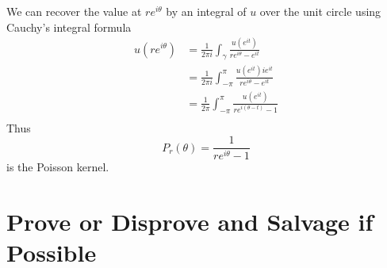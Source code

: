 \documentclass{homework}
\begin{document}
                                                                                                                                             \begin{solution}
                                                                                                                                             We can recover the value at $re^{i\theta}$ by an integral of $u$ over the unit circle using Cauchy's integral formula
                                                                                                                                             \begin{align*}
                                                                                                                                             u(re^{i\theta}) &= \frac{1}{2\pi i}\int_{\gamma} \frac{u(e^{it})}{re^{i\theta} - e^{it}}\\
                                                                                                                                             &= \frac{1}{2\pi i}\int_{-\pi}^{\pi} \frac{u(e^{it})ie^{it}}{re^{i\theta} - e^{it}}\\
                                                                                                                                             &= \frac{1}{2\pi}\int_{-\pi}^{\pi} \frac{u(e^{it})}{re^{i(\theta - t)} - 1}\\
                                                                                                                                             \end{align*}
                                                                                                                                             Thus 
                                                                                                                                             \[P_r(\theta) = \frac{1}{re^{i\theta} - 1}\]
                                                                                                                                             is the Poisson kernel.

                                                                                                                                             \end{solution}
                                                                                                                                             \section{Prove or Disprove and Salvage if Possible}
\end{document}

